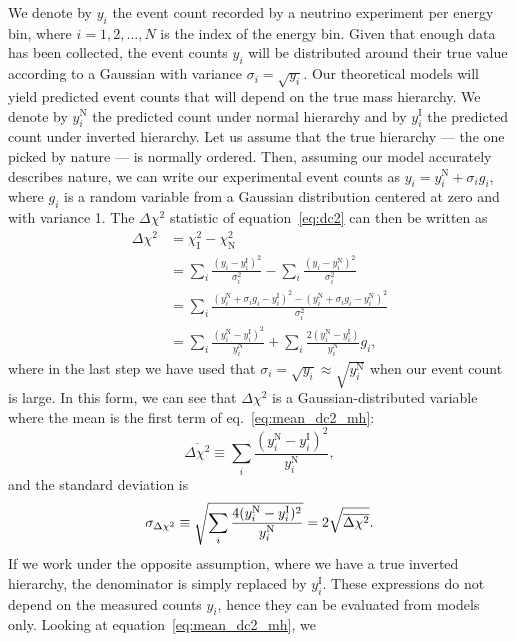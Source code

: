 We denote by $y_i$ the event count recorded by a neutrino experiment per energy
bin, where $i = 1, 2, ..., N$ is the index of the energy bin.
Given that enough data has been collected,
the event counts $y_i$ will be distributed around their true value
according to a Gaussian with variance $\sigma_i=\sqrt{y_i}$. 
Our theoretical models will yield predicted event counts that will depend on
the true mass hierarchy.  We denote by $y^\text{N}_i$ the predicted count under normal
hierarchy and by $y^\text{I}_i$ the predicted count under inverted hierarchy.
Let us assume that the true hierarchy --- the one picked by nature --- is normally
ordered. Then, assuming our model accurately describes nature,  we can write
our experimental event counts as $y_i = y^\text{N}_i + \sigma_i g_i$, where
$g_i$ is a random variable from a Gaussian distribution centered at zero and
with variance 1.
The $\Delta \chi^2$ statistic of equation~\ref{eq:dc2} can then be written as
\begin{align}
	\Delta \chi^2 &= \chi_\text{I}^2 - \chi_\text{N}^2\nonumber\\
	&= \sum_i \frac{(y_i - y^\text{I}_i)^2}{\sigma_i^2} - \sum_i \frac{(y_i -
	y^\text{N}_i)^2}{\sigma_i^2}\nonumber\\
	&= \sum_i \frac{(y^\text{N}_i + \sigma_i g_i - y^\text{I}_i)^2 - (y^\text{N}_i + \sigma_i g_i -
	y^\text{N}_i)^2}{\sigma_i^2}\nonumber\\
	&= \sum_i \frac{(y^\text{N}_i - y^\text{I}_i)^2}{y^\text{N}_i} + \sum_i
	\frac{2(y^\text{N}_i -
	y^\text{I}_i)}{y^\text{N}_i} g_i,\label{eq:mean_dc2_mh}
\end{align}
where in the last step we have used that $\sigma_i = \sqrt{y_i} \approx \sqrt{y^\text{N}_i}$
when our event count is large.
In this form, we can see that $\Delta \chi^2$ is a Gaussian-distributed
variable where the mean is the first term of eq.~\ref{eq:mean_dc2_mh}:
\begin{equation}
	\overline{\Delta\chi^2} \equiv \sum_i \frac{(y^\text{N}_i -
y^\text{I}_i)^2}{y^\text{N}_i},\end{equation}
and the standard deviation is
$$\sigma_{\Delta\chi^2} \equiv \sqrt{\sum_i \frac{4(y^\text{N}_i -
y^\text{I}_i)^2}{y^\text{N}_i}}\\
= 2\sqrt{\overline{\Delta\chi^2}}.$$
If we work under the opposite assumption, where we have a true inverted
hierarchy, the denominator is simply replaced by $y^\text{I}_i$.
These expressions do not depend on the measured counts $y_i$, hence they can be
evaluated from models only. Looking at equation~\ref{eq:mean_dc2_mh}, we
